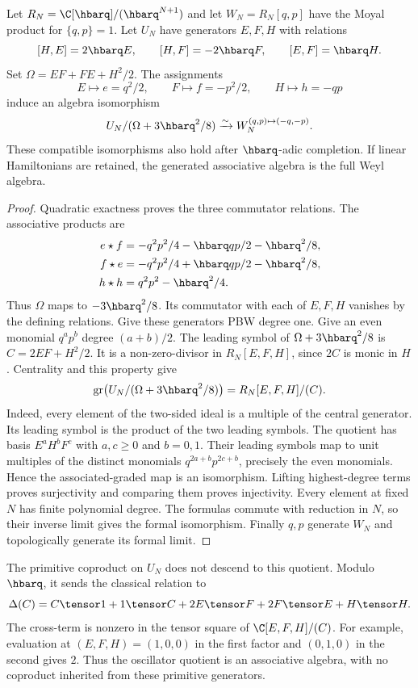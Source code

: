 \begin{proposition}\label{prop:vol2-oscillator-quotient}
Let $R_N=\C[\hbarq]/(\hbarq^{N+1})$ and let $W_N=R_N[q,p]$
have the Moyal product for $\{q,p\}=1$.
Let $U_N$ have generators $E,F,H$ with relations
\[
 [H,E]=2\hbarq E,\qquad [H,F]=-2\hbarq F,\qquad [E,F]=\hbarq H.
\]
Set $\Omega=EF+FE+H^2/2$.
The assignments
\[
 E\longmapsto e=q^2/2,\qquad
 F\longmapsto f=-p^2/2,\qquad
 H\longmapsto h=-qp
\]
induce an algebra isomorphism
\[
 U_N/(\Omega+3\hbarq^2/8)
 \xrightarrow{\sim} W_N^{(q,p)\mapsto(-q,-p)}.
\]
These compatible isomorphisms also hold after $\hbarq$-adic completion.
If linear Hamiltonians are retained, the generated associative algebra is the full Weyl algebra.
\end{proposition}
\begin{proof}
Quadratic exactness proves the three commutator relations.
The associative products are
\[
\begin{split}
 e\star f&=-q^2p^2/4-\hbarq qp/2-\hbarq^2/8,\\
 f\star e&=-q^2p^2/4+\hbarq qp/2-\hbarq^2/8,\\
 h\star h&=q^2p^2-\hbarq^2/4.
\end{split}
\]
Thus $\Omega$ maps to $-3\hbarq^2/8$.
Its commutator with each of $E,F,H$ vanishes by the defining relations.
Give these generators PBW degree one.
Give an even monomial $q^ap^b$ degree $(a+b)/2$.
The leading symbol of $\Omega+3\hbarq^2/8$ is
$C=2EF+H^2/2$.
It is a non-zero-divisor in $R_N[E,F,H]$, since $2C$ is monic in $H$.
Centrality and this property give
\[
 \operatorname{gr}\bigl(U_N/(\Omega+3\hbarq^2/8)\bigr)
 =R_N[E,F,H]/(C).
\]
Indeed, every element of the two-sided ideal is a multiple of the central generator.
Its leading symbol is the product of the two leading symbols.
The quotient has basis $E^aH^bF^c$ with $a,c\ge0$ and $b=0,1$.
Their leading symbols map to unit multiples of the distinct monomials
$q^{2a+b}p^{2c+b}$, precisely the even monomials.
Hence the associated-graded map is an isomorphism.
Lifting highest-degree terms proves surjectivity and comparing them proves injectivity.
Every element at fixed $N$ has finite polynomial degree.
The formulas commute with reduction in $N$, so their inverse limit gives the formal isomorphism.
Finally $q,p$ generate $W_N$ and topologically generate its formal limit.
\end{proof}

The primitive coproduct on $U_N$ does not descend to this quotient.
Modulo $\hbarq$, it sends the classical relation to
\[
 \Delta(C)=C\tensor1+1\tensor C
   +2E\tensor F+2F\tensor E+H\tensor H.
\]
The cross-term is nonzero in the tensor square of $\C[E,F,H]/(C)$.
For example, evaluation at $(E,F,H)=(1,0,0)$ in the first factor
and $(0,1,0)$ in the second gives $2$.
Thus the oscillator quotient is an associative algebra, with no coproduct inherited from these primitive generators.

